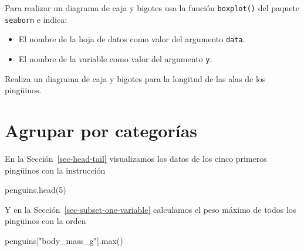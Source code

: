 \documentclass[
  a4paper,
  noprof,
  12pt,
  notoc,
  nosols,
  nobib]{mnye}
\newenvironment{Shaded}{\begin{snugshade}}{\end{snugshade}}
\newcommand{\BuiltInTok}[1]{\textcolor[rgb]{0.00,0.23,0.31}{#1}}
\newcommand{\DecValTok}[1]{\textcolor[rgb]{0.68,0.00,0.00}{#1}}
\newcommand{\NormalTok}[1]{\textcolor[rgb]{0.00,0.23,0.31}{#1}}
\newcommand{\StringTok}[1]{\textcolor[rgb]{0.13,0.47,0.30}{#1}}
\providecommand{\tightlist}{%
  \setlength{\itemsep}{0pt}\setlength{\parskip}{0pt}}\usepackage{longtable,booktabs,array}
\renewenvironment{exercise}[1][]{
            \if\relax\detokenize{#1}\relax
                \ex
            \else
                \ex[note={#1}]
            \fi
        }{\endex}
\theoremstyle{definition}
\newtheorem{exercise}{Ejercicio}[section]
\theoremstyle{remark}
\begin{document}
\begin{tcolorbox}[enhanced jigsaw, opacityback=0, leftrule=.75mm, left=2mm, arc=.35mm, rightrule=.15mm, colframe=quarto-callout-note-color-frame, bottomrule=.15mm, colback=white, breakable, toprule=.15mm]
\begin{minipage}[t]{5.5mm}
\textcolor{quarto-callout-note-color}{\faInfo}
\end{minipage}%
\begin{minipage}[t]{\textwidth - 5.5mm}

Para realizar un diagrama de caja y bigotes usa la función
\texttt{boxplot()} del paquete \texttt{seaborn} e indica:

\begin{itemize}
\tightlist
\item
  El nombre de la hoja de datos como valor del argumento \texttt{data}.
\item
  El nombre de la variable como valor del argumento \texttt{y}.
\end{itemize}

\end{minipage}%
\end{tcolorbox}

\begin{exercise}[]%
\protect\hypertarget{exr-1numerical-boxplot}{}\label{exr-1numerical-boxplot}%
Realiza un diagrama de caja y bigotes para la longitud de las alas de
los pingüinos.

\end{exercise}


\section{Agrupar por categorías}\label{sec-groupby}

En la Sección~\ref{sec-head-tail} visualizamos los datos de los cinco
primeros pingüinos con la instrucción

\begin{Shaded}
\begin{Highlighting}[]
\NormalTok{penguins.head(}\DecValTok{5}\NormalTok{)}
\end{Highlighting}
\end{Shaded}

Y en la Sección~\ref{sec-subset-one-variable} calculamos el peso máximo
de todos los pingüinos con la orden

\begin{Shaded}
\begin{Highlighting}[]
\NormalTok{penguins[}\StringTok{"body\_mass\_g"}\NormalTok{].}\BuiltInTok{max}\NormalTok{()}
\end{Highlighting}
\end{Shaded}
\end{document}

